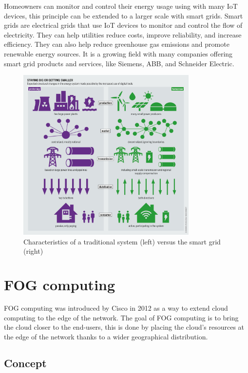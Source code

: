 Homeowners can monitor and control their energy usage using with many IoT devices, this principle can be extended to a larger
scale with smart grids. Smart grids are electrical grids that use IoT devices to monitor and control the flow of electricity.
They can help utilities reduce costs, improve reliability, and increase efficiency. They can also help reduce greenhouse gas
emissions and promote renewable energy sources. It is a growing field with many companies offering smart grid products and
services, like Siemens, ABB, and Schneider Electric.

\begin{figure}[H]
  \centering
  \includegraphics[width=0.80\textwidth]{../images/smart-grid.jpg}
  \caption{Characteristics of a traditional system (left) versus the smart grid (right)~\cite{bartz-stockmar-2018}}
  \label{fig:smart-grid}
\end{figure}

\chapter{FOG computing}
\label{chap:fog}

FOG computing was introduced by Cisco in 2012 as a way to extend cloud computing to the edge of the network. The goal
of FOG computing is to bring the cloud closer to the end-users, this is done by placing the cloud's resources at the
edge of the network thanks to a wider geographical distribution.

\section{Concept}
\label{sec:fog-concept}

